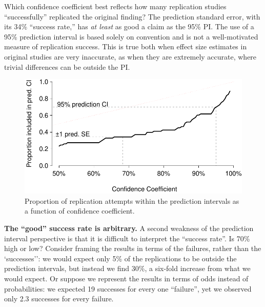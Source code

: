 \documentclass[doc,a4paper,floatsintext,draftfirst]{apa6}
\makeatletter
\def\maxwidth{ %
  \ifdim\Gin@nat@width>\linewidth
    \linewidth
  \else
    \Gin@nat@width
  \fi
}
\makeatother
\begin{document}
Which confidence coefficient best reflects how many replication studies ``successfully'' replicated the original finding? The prediction standard error, with its 34\% ``success rate,'' has {\em at least} as good a claim as the 95\% PI. The use of a 95\% prediction interval is based solely on convention and is not a well-motivated measure of replication success. This is true both when effect size estimates in original studies are very inaccurate, as when they are extremely accurate, where trivial differences can be outside the PI. 

\begin{figure}
\includegraphics[width=\maxwidth]{figure/conf_coef-1} \caption[Proportion of replication attempts within the prediction intervals as a function of confidence coefficient]{Proportion of replication attempts within the prediction intervals as a function of confidence coefficient.}\label{fig:conf.coef}
\end{figure}

{\bf The ``good'' success rate is arbitrary.} A second weakness of the prediction interval perspective is that it is difficult to interpret the ``success rate''. Is 70\% high or low? Consider framing the results in terms of the failures, rather than the `successes'': we would expect only 5\% of the replications to be outside the prediction intervals, but instead we find 30\%, a six-fold increase from what we would expect. Or suppose we represent the results in terms of odds instead of probabilities: we expected 19 successes for every one ``failure'', yet we observed only 2.3 successes for every failure. 
\end{document}
